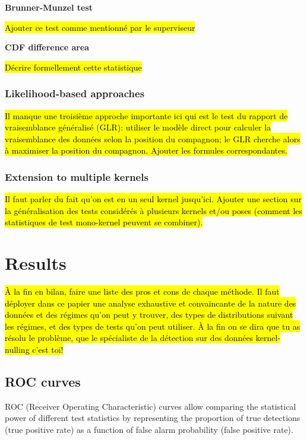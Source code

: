 \documentclass{article}
\begin{document}
\textbf{Brunner-Munzel test}

\hl{Ajouter ce test comme mentionné par le superviseur}

\textbf{CDF difference area}

\hl{Décrire formellement cette statistique}

\subsubsection{Likelihood-based approaches}

\hl{Il manque une troisième approche importante ici qui est le test du rapport de vraisemblance généralisé (GLR): utiliser le modèle direct pour calculer la vraisemblance des données selon la position du compagnon; le GLR cherche alors à maximiser la position du compagnon. Ajouter les formules correspondantes.}

\subsubsection{Extension to multiple kernels}

\hl{Il faut parler du fait qu'on est en un seul kernel jusqu'ici. Ajouter une section sur la généralisation des tests considérés à plusieurs kernels et/ou poses (comment les statistiques de test mono-kernel peuvent se combiner).}


\section{Results}

\hl{À la fin en bilan, faire une liste des pros et cons de chaque méthode. Il faut déployer dans ce papier une analyse exhaustive et convaincante de la nature des données et des régimes qu'on peut y trouver, des types de distributions suivant les régimes, et des types de tests qu'on peut utiliser. À la fin on se dira que tu as résolu le problème, que le spécialiste de la détection sur des données kernel-nulling c'est toi!}

\subsection{ROC curves}

ROC (Receiver Operating Characteristic) curves allow comparing the statistical power of different test statistics by representing the proportion of true detections (true positive rate) as a function of false alarm probability (false positive rate).
\end{document}
